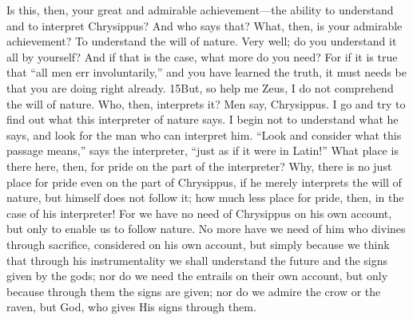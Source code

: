 Is this, then, your great and admirable achievement—the ability to understand and to interpret Chrysippus? And who says that? What, then, is your admirable achievement? To understand the will of nature. Very well; do you understand it all by yourself? And if that is the case, what more do you need? For if it is true that ``all men err involuntarily,'' and you have learned the truth, it must needs be that you are doing right already. 15But, so help me Zeus, I do not comprehend the will of nature. Who, then, interprets it? Men say, Chrysippus. I go and try to find out what this interpreter of nature says. I begin not to understand what he says, and look for the man who can interpret him. ``Look and consider what this passage means,'' says the interpreter, ``just as if it were in Latin!'' What place is there here, then, for pride on the part of the interpreter? Why, there is no just place for pride even on the part of Chrysippus, if he merely interprets the will of nature, but himself does not follow it; how much less place for pride, then, in the case of his interpreter! For we have no need of Chrysippus on his own account, but only to enable us to follow nature. No more have we need of him who divines through sacrifice, considered on his own account, but simply because we think that through his instrumentality we shall understand the future and the signs given by the gods; nor do we need the entrails on their own account, but only because through them the signs are given; nor do we admire the crow or the raven, but God, who gives His signs through them.

